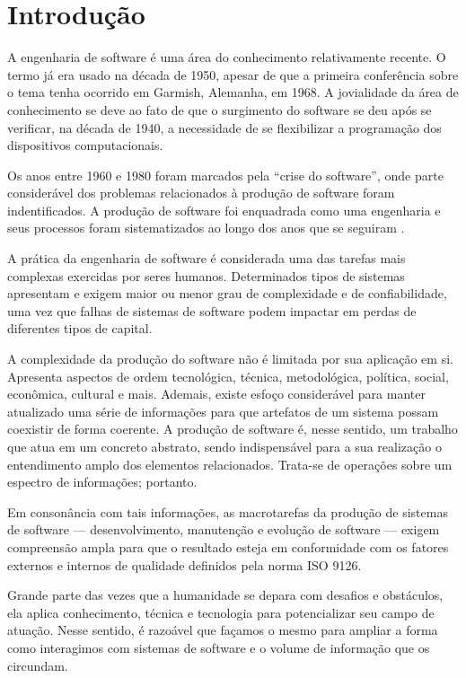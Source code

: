 
\section{Introdução}

\lettrine{A}{} engenharia de software é uma área do conhecimento relativamente
recente. O termo já era usado na década de 1950, apesar de que a primeira
conferência sobre o tema tenha ocorrido em Garmish, Alemanha, em 1968. A
jovialidade da área de conhecimento se deve ao fato de que o surgimento do
software se deu após se verificar, na década de 1940, a necessidade de se
flexibilizar a programação dos dispositivos computacionais\cite{Wazlawick2013}.

Os anos entre 1960 e 1980 foram marcados pela ``crise do software'', onde parte
considerável dos problemas relacionados à produção de software foram
indentificados. A produção de software foi enquadrada como uma engenharia e seus
processos foram sistematizados ao longo dos anos que se seguiram
\cite{Wazlawick2013}.

A prática da engenharia de software é considerada uma das tarefas mais complexas
exercidas por seres humanos\cite{Crockford2008}. Determinados tipos de sistemas
apresentam e exigem maior ou menor grau de complexidade e de confiabilidade, uma
vez que falhas de sistemas de software podem impactar em perdas de diferentes
tipos de capital.

A complexidade da produção do software não é limitada por sua aplicação em si.
Apresenta aspectos de ordem tecnológica, técnica, metodológica, política,
social, econômica, cultural e mais. Ademais, existe esfoço considerável para
manter atualizado uma série de informações para que artefatos de um sistema
possam coexistir de forma coerente. A produção de software é, nesse sentido,
um trabalho que atua em um concreto abstrato, sendo indispensável para a sua
realização o entendimento amplo dos elementos relacionados. Trata-se de
operações sobre um espectro de informações; portanto.

Em consonância com tais informações, as macrotarefas da produção de sistemas de
software --- desenvolvimento, manutenção e evolução de software --- exigem
compreensão ampla para que o resultado esteja em conformidade com os fatores
externos e internos de qualidade definidos pela norma ISO 9126\cite{ISOIEC9126}.

Grande parte das vezes que a humanidade se depara com desafios e obstáculos,
ela aplica conhecimento, técnica e tecnologia para potencializar seu campo de
atuação. Nesse sentido, é razoável que façamos o mesmo para ampliar a forma como
interagimos com sistemas de software e o volume de informação que os circundam.
